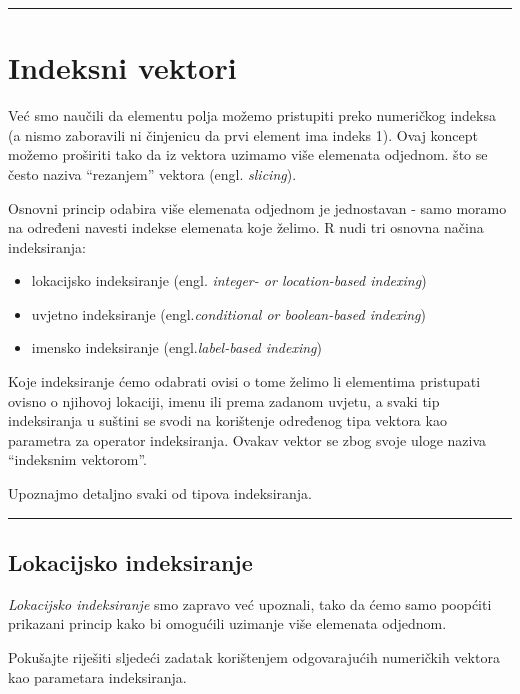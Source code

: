\documentclass[]{book}
\providecommand{\tightlist}{%
  \setlength{\itemsep}{0pt}\setlength{\parskip}{0pt}}
\theoremstyle{definition}
\theoremstyle{definition}
\theoremstyle{definition}
\theoremstyle{remark}
\begin{document}
\begin{center}\rule{0.5\linewidth}{\linethickness}\end{center}

\section{Indeksni vektori}\label{indeksni-vektori}

Već smo naučili da elementu polja možemo pristupiti preko numeričkog
indeksa (a nismo zaboravili ni činjenicu da prvi element ima indeks 1).
Ovaj koncept možemo proširiti tako da iz vektora uzimamo više elemenata
odjednom. što se često naziva ``rezanjem'' vektora (engl.
\emph{slicing}).

Osnovni princip odabira više elemenata odjednom je jednostavan - samo
moramo na određeni navesti indekse elemenata koje želimo. R nudi tri
osnovna načina indeksiranja:

\begin{itemize}
\tightlist
\item
  lokacijsko indeksiranje (engl. \emph{integer- or location-based
  indexing})
\item
  uvjetno indeksiranje (engl.\emph{conditional or boolean-based
  indexing})
\item
  imensko indeksiranje (engl.\emph{label-based indexing})
\end{itemize}

Koje indeksiranje ćemo odabrati ovisi o tome želimo li elementima
pristupati ovisno o njihovoj lokaciji, imenu ili prema zadanom uvjetu, a
svaki tip indeksiranja u suštini se svodi na korištenje određenog tipa
vektora kao parametra za operator indeksiranja. Ovakav vektor se zbog
svoje uloge naziva ``indeksnim vektorom''.

Upoznajmo detaljno svaki od tipova indeksiranja.

\begin{center}\rule{0.5\linewidth}{\linethickness}\end{center}

\subsection{Lokacijsko indeksiranje}\label{lokacijsko-indeksiranje}

\emph{Lokacijsko indeksiranje} smo zapravo već upoznali, tako da ćemo
samo poopćiti prikazani princip kako bi omogućili uzimanje više
elemenata odjednom.

Pokušajte riješiti sljedeći zadatak korištenjem odgovarajućih numeričkih
vektora kao parametara indeksiranja.
\end{document}
